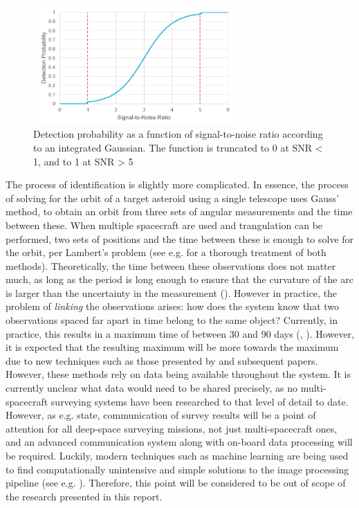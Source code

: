 \begin{figure}[htbp]
 \centering
 \includegraphics[width=0.7\textwidth]{img/snr_graph.png}
 \caption{Detection probability as a function of signal-to-noise ratio according to an integrated Gaussian. The function is truncated to 0 at SNR < 1, and to 1 at SNR > 5}
 \label{fig:snrgraph}
\end{figure}

The process of identification is slightly more complicated. In essence, the process of solving for the orbit of a target asteroid using a single telescope uses Gauss' method, to obtain an orbit from three sets of angular measurements and the time between these. When multiple spacecraft are used and trangulation can be performed, two sets of positions and the time between these is enough to solve for the orbit, per Lambert's problem (see e.g. \cite{Curtis} for a thorough treatment of both methods). Theoretically, the time between these observations does not matter much, as long as the period is long enough to ensure that the curvature of the arc is larger than the uncertainty in the measurement (\cite{OpNav}). However in practice, the problem of \textit{linking} the observations arises: how does the system know that two observations spaced far apart in time belong to the same object? Currently, in practice, this results in a maximum time of between 30 and 90 days (\cite{DetectionAndTracking}, \cite{2017NEOSDT}). However, it is expected that the resulting maximum will be more towards the maximum due to new techniques such as those presented by \cite{ShortArcs} and subsequent papers.\\

However, these methods rely on data being available throughout the system. It is currently unclear what data would need to be shared precisely, as no multi-spacecraft surveying systems have been researched to that level of detail to date. However, as e.g. \cite{2017NEOSDT} state, communication of survey results will be a point of attention for all deep-space surveying missions, not just multi-spacecraft ones, and an advanced communication system along with on-board data processing will be required. Luckily, modern techniques such as machine learning are being used to find computationally unintensive and simple solutions to the image processing pipeline (see e.g. \cite{AIImage}). Therefore, this point will be considered to be out of scope of the research presented in this report. \\

